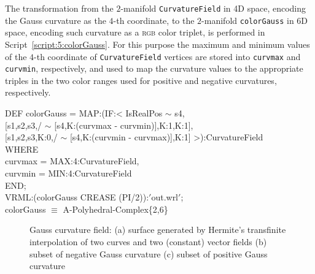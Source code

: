 \documentclass{31x47jw}
\begin{document}
The transformation from the $2$-manifold \texttt{CurvatureField} in 4D
space, encoding the Gauss  curvature as the $4$-th coordinate, to the
$2$-manifold \texttt{colorGauss} in 6D space, encoding such curvature
as a \textsc{rgb} color triplet, is performed in
Script~\ref{script:5:colorGauss}.  For this purpose the maximum and
minimum values of the $4$-th coordinate of \texttt{CurvatureField}
vertices are stored into \texttt{curvmax} and \texttt{curvmin},
respectively, and used to map the curvature values to the appropriate 
triples in the two color ranges used for positive and negative 
curvatures, respectively.

\begin{script}
\begin{smallplasm}
DEF colorGauss  = MAP:(IF:< IsRealPos $\sim$ s4, \+\\{}
     [s1,s2,s3,/ $\sim$ [s4,K:(curvmax - curvmin)],K:1,K:1], \\{}
     [s1,s2,s3,K:0,/ $\sim$ [s4,K:(curvmin - curvmax)],K:1] %
>):CurvatureField\-\\
WHERE\+\\
  curvmax = MAX:4:CurvatureField, \\
  curvmin = MIN:4:CurvatureField \-\\
END;\\[0.3cm]

VRML:(colorGauss CREASE (PI/2)):$'$out.wrl$'$;\\
colorGauss $\equiv$ A-Polyhedral-Complex\{2,6\}
\end{smallplasm}
\label{script:5:colorGauss}
\end{script}

\begin{figure}[h]
\begin{minipage}[c]{0.327\linewidth}
    \centering{}
\end{minipage}
\begin{minipage}[c]{0.327\linewidth}
    \centering{}
\end{minipage}
\begin{minipage}[c]{0.327\linewidth}
    \centering{}
\end{minipage}
\caption{Gauss  curvature field: (a) surface generated by Hermite's
transfinite interpolation of two curves and two (constant)
vector fields (b) subset of negative Gauss  curvature (c) subset of
positive Gauss  curvature
\label{fig:5:gauss}}
\end{figure}



                     
    
\end{document}
